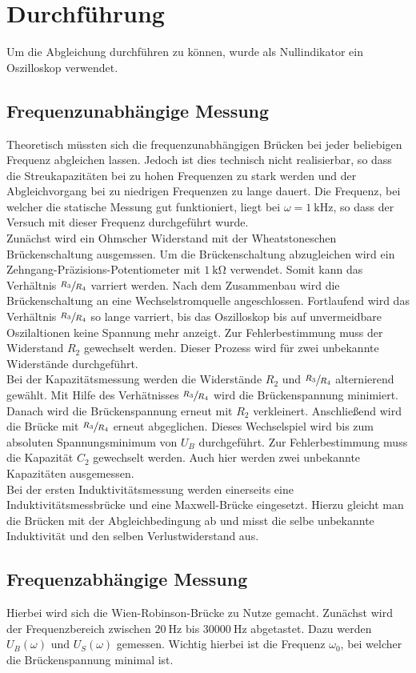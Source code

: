 \section{Durchführung}
\label{sec:Durchführung}
Um die Abgleichung durchführen zu können, wurde als Nullindikator ein Oszilloskop verwendet.
\subsection{Frequenzunabhängige Messung}
Theoretisch müssten sich die frequenzunabhängigen Brücken bei jeder beliebigen Frequenz abgleichen lassen. Jedoch ist dies technisch nicht realisierbar,
so dass die Streukapazitäten bei zu hohen Frequenzen zu stark werden und der Abgleichvorgang bei zu niedrigen Frequenzen zu lange dauert.   
Die Frequenz, bei welcher die statische Messung gut funktioniert, liegt bei  $ \omega = \SI{1}{\kilo\hertz}$, so dass der Versuch mit dieser Frequenz durchgeführt wurde.\\
Zunächst wird ein Ohmscher Widerstand mit der Wheatstoneschen Brückenschaltung ausgemssen. Um die Brückenschaltung abzugleichen wird ein 
Zehngang-Präzisions-Potentiometer  mit $\SI{1}{\kilo\ohm}$ verwendet. Somit kann das Verhältnis $\sfrac{R_3}{R_4}$ varriert werden.
Nach dem Zusammenbau wird die Brückenschaltung an eine Wechselstromquelle angeschlossen. Fortlaufend wird das Verhältnis 
$\sfrac{R_3}{R_4}$ so lange varriert, bis das Oszilloskop bis auf unvermeidbare 
Oszilaltionen keine Spannung mehr anzeigt. Zur Fehlerbestimmung muss der Widerstand $R_2$ gewechselt werden.
Dieser Prozess wird für zwei unbekannte Widerstände durchgeführt.\\
Bei der Kapazitätsmessung werden die Widerstände $R_2$ und $\sfrac{R_3}{R_4}$ alternierend gewählt. Mit Hilfe des Verhätnisses 
$\sfrac{R_3}{R_4}$ wird die Brückenspannung minimiert. Danach wird die Brückenspannung erneut mit $R_2$ verkleinert. Anschließend 
wird die Brücke mit $\sfrac{R_3}{R_4}$ erneut abgeglichen. Dieses Wechselspiel wird bis zum absoluten Spannungsminimum von $U_B$ durchgeführt.
Zur Fehlerbestimmung muss die Kapazität $C_2$ gewechselt werden. Auch hier werden zwei unbekannte Kapazitäten ausgemessen.\\
Bei der ersten Induktivitätsmessung werden einerseits eine Induktivitätsmessbrücke und eine Maxwell-Brücke eingesetzt. 
Hierzu gleicht man die Brücken mit der Abgleichbedingung ab und misst die selbe unbekannte Induktivität und den selben Verlustwiderstand aus.\\
\subsection{Frequenzabhängige Messung}
Hierbei wird sich die Wien-Robinson-Brücke zu Nutze gemacht. Zunächst wird der Frequenzbereich zwischen $\SI{20}{\hertz}$ bis $\SI{30000}{\hertz}$
abgetastet. Dazu werden $U_B\left(\omega\right)$ und $U_S\left(\omega\right)$ gemessen. Wichtig hierbei ist die Frequenz $\omega_0$, bei welcher die Brückenspannung
minimal ist.